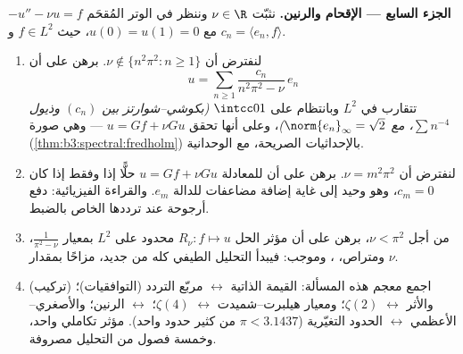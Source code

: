 \begin{problem}
\medskip
\noindent\textbf{الجزء السابع --- الإقحام والرنين.} نثبّت
$\nu \in \R$ وننظر في الوتر المُقحَم $-u'' - \nu u =
f$ مع $u(0) = u(1) = 0$، حيث
$f \in L^2$ و $c_n = \langle
e_n, f\rangle$.
\begin{enumerate}[resume]
  \item لنفترض أن $\nu \notin \{n^2\pi^2 : n \geq 1\}$. برهن على أن
        \[
        u = \sum_{n\geq1}\frac{c_n}{n^2\pi^2 - \nu}\,e_n
        \]
        تتقارب في $L^2$ وبانتظام على $\intcc01$
        \emph{(بكوشي--شوارتز بين $(c_n)$ وذيول $\sum n^{-4}$،
        مع $\norm{e_n}_\infty =
        \sqrt2$)}، وعلى أنها تحقق $u = Gf + \nu Gu$ --- وهي صورة  (\cref{thm:b3:spectral:fredholm}) بالإحداثيات الصريحة، مع
        الوحدانية.
  \item لنفترض أن $\nu = m^2\pi^2$. برهن على أن للمعادلة
        $u = Gf + \nu
        Gu$ حلًّا إذا وفقط إذا كان $c_m = 0$، وهو وحيد
        إلى غاية إضافة مضاعفات للدالة $e_m$. والقراءة
        الفيزيائية: دفع أرجوحة عند ترددها الخاص بالضبط.
  \item من أجل $\nu < \pi^2$، برهن على أن مؤثر الحل $R_\nu\colon f \mapsto u$
        محدود على $L^2$ بمعيار $\frac1{\pi^2 - \nu}$، ومتراص، ، وموجب: فيبدأ التحليل الطيفي كله من جديد،
        مزاحًا بمقدار $\nu$.
  \item (تركيب) اجمع معجم هذه المسألة: القيمة الذاتية $\leftrightarrow$
        مربّع التردد (التوافقيات)؛ والأثر $\leftrightarrow$ $\zeta(2)$؛
        ومعيار هيلبرت--شميدت $\leftrightarrow$ $\zeta(4)$؛ 
        $\leftrightarrow$ الرنين؛ والأصغري--الأعظمي $\leftrightarrow$ الحدود
        التغيّرية ($\pi <
        3.1437$ من كثير حدود واحد). مؤثر تكاملي
        واحد، وخمسة فصول من التحليل مصروفة.
\end{enumerate}


\end{problem}
